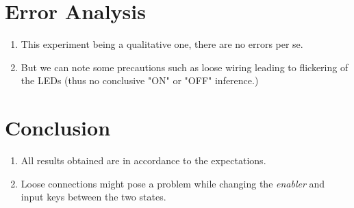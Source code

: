 \section{Error Analysis}
\begin{enumerate}
    \item This experiment being a qualitative one, there are no errors per se.
    \item But we can note some precautions such as loose wiring leading to flickering of the LEDs (thus no conclusive "ON" or "OFF" inference.)
\end{enumerate}
\section{Conclusion}
\begin{enumerate}
    \item All results obtained are in accordance to the expectations.
    \item Loose connections might pose a problem while changing the \emph{enabler} and input keys between the two states.
\end{enumerate}